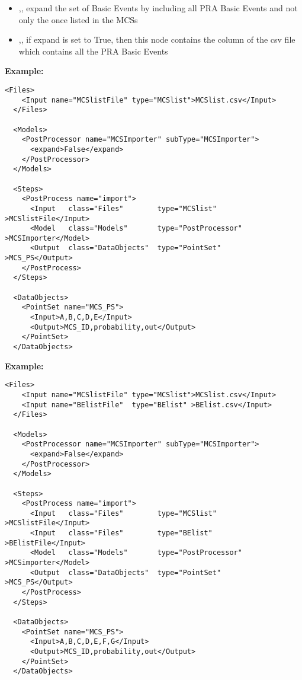 %
%
\begin{itemize}
  \item  {},, expand the set of Basic Events by including all PRA Basic Events
  and not only the once listed in the MCSs
  \item  {},, if expand is set to True, then this node contains the 
  column of the csv file which contains all the PRA Basic Events
\end{itemize}

\textbf{Example:}
\begin{lstlisting}[style=XML,morekeywords={anAttribute},caption=MCS Importer input example (no expand)., label=lst:MCS_PP_InputExample]
  <Files>
    <Input name="MCSlistFile" type="MCSlist">MCSlist.csv</Input>
  </Files>
  
  <Models>
    <PostProcessor name="MCSImporter" subType="MCSImporter">
      <expand>False</expand>
    </PostProcessor>   
  </Models>

  <Steps>
    <PostProcess name="import">
      <Input   class="Files"        type="MCSlist"         >MCSlistFile</Input>
      <Model   class="Models"       type="PostProcessor"   >MCSImporter</Model>
      <Output  class="DataObjects"  type="PointSet"        >MCS_PS</Output>
    </PostProcess>
  </Steps>
  
  <DataObjects>
    <PointSet name="MCS_PS">
      <Input>A,B,C,D,E</Input>
      <Output>MCS_ID,probability,out</Output>
    </PointSet>
  </DataObjects>
\end{lstlisting}

\textbf{Example:}
\begin{lstlisting}[style=XML,morekeywords={anAttribute},caption=MCS Importer input example (expanded)., label=lst:MCS_PP_InputExample]
  <Files>
    <Input name="MCSlistFile" type="MCSlist">MCSlist.csv</Input>
    <Input name="BElistFile"  type="BElist" >BElist.csv</Input>
  </Files>
  
  <Models>
    <PostProcessor name="MCSImporter" subType="MCSImporter">
      <expand>False</expand>
    </PostProcessor>   
  </Models>

  <Steps>
    <PostProcess name="import">
      <Input   class="Files"        type="MCSlist"         >MCSlistFile</Input>
      <Input   class="Files"        type="BElist"          >BElistFile</Input>
      <Model   class="Models"       type="PostProcessor"   >MCSimporter</Model>
      <Output  class="DataObjects"  type="PointSet"        >MCS_PS</Output>
    </PostProcess>
  </Steps>
  
  <DataObjects>
    <PointSet name="MCS_PS">
      <Input>A,B,C,D,E,F,G</Input>
      <Output>MCS_ID,probability,out</Output>
    </PointSet>
  </DataObjects>
\end{lstlisting}

